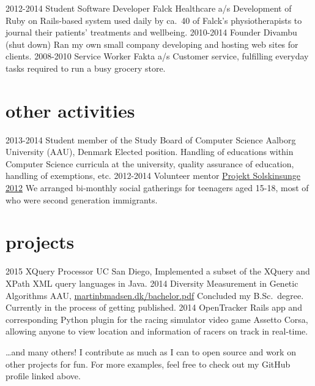 \documentclass{afriggeri-cv/friggeri-cv}
\newcommand{\aau}{%
  Aalborg University (AAU), Denmark
}
\begin{document}
\begin{entrylist}
  \entry
    {2012-2014}
    {Student Software Developer}
    {Falck Healthcare a/s}
    {Development of Ruby on Rails-based system used daily by ca.\ 40 of Falck's physiotherapists to journal their patients' treatments and wellbeing.}
  \entry
    {2010-2014}
    {Founder}
    {Divambu (shut down)}
    {Ran my own small company developing and hosting web sites for clients.}
  \entry
    {2008-2010}
    {Service Worker}
    {Fakta a/s}
    {Customer service, fulfilling everyday tasks required to run a busy grocery store.} 
\end{entrylist}

\section{other activities}
\begin{entrylist}
  \entry
    {2013-2014}
    {Student member of the Study Board of Computer Science}
    {\aau}
    {Elected position. Handling of educations within Computer Science curricula at the university, quality assurance of education, handling of exemptions, etc.}
  \entry
    {2012-2014}
    {Volunteer mentor}
    {\href{http://www.urk.dk/hvad-goer-vi/mentoring-og-raadgivning/solskinsunge/}{Projekt Solskinsunge 2012}}
    {We arranged bi-monthly social gatherings for teenagers aged 15-18, most of who were second generation immigrants.}
  
\end{entrylist}

\section{projects}
\begin{entrylist}
  \entry
    {2015}
    {XQuery Processor}
    {UC San Diego, }
    {Implemented a subset of the XQuery and XPath XML query languages in Java.}
  \entry
    {2014}
    {Diversity Measurement in Genetic Algorithms}
    {AAU, \href{http://martinbmadsen.dk/bachelor.pdf}{martinbmadsen.dk/bachelor.pdf}}
    {Concluded my B.Sc.\ degree. Currently in the process of getting published.}
  \entry
    {2014}
    {OpenTracker}
    {}
    {Rails app and corresponding Python plugin for the racing simulator video game Assetto Corsa, allowing anyone to view location and information of racers on track in real-time.}
\end{entrylist}

\dots and many others! I contribute as much as I can to open source and work on other projects for fun. For more examples, feel free to check out my GitHub profile linked above.
\end{document}
